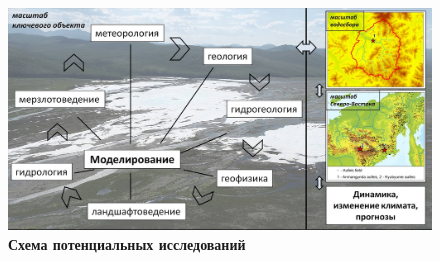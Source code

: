 \begin{figure}[h!]
\begin{changemargin}{-1.25cm}{0cm}
  \begin{center}
    \includegraphics[width=1.2\textwidth]{authors/nesterova-2-fig-1.jpg}
  \end{center}
\end{changemargin}
  \caption*{\textbf{Схема потенциальных исследований}}
  \label{fig:nesterova-1-fig-1}
\end{figure}
